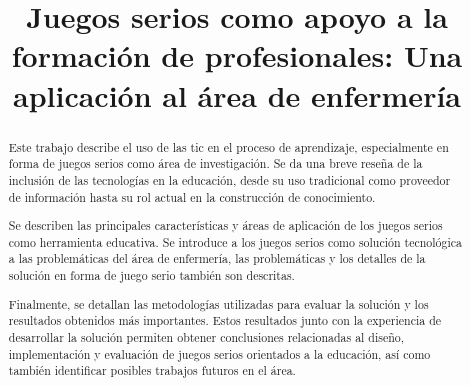 \documentclass[conference]{util/IEEEtran}
\begin{document}



\title{Juegos serios como apoyo a la formación de profesionales: Una aplicación al área de enfermería}

\author{
\and
{}
}

\maketitle
\thispagestyle{plain}


\begin{abstract}

Este trabajo describe el uso de las \gls{tic} en el proceso de aprendizaje, especialmente en forma de juegos serios como área de investigación. Se da una breve reseña de la inclusión de las tecnologías en la educación, desde su uso tradicional como proveedor de información hasta su rol actual en la construcción de conocimiento. 

Se describen las principales características y áreas de aplicación de los juegos serios como herramienta educativa. Se introduce a los juegos serios como solución tecnológica a las problemáticas del área de enfermería, las problemáticas y los detalles de la solución en forma de juego
serio también son descritas.

Finalmente, se detallan las metodologías utilizadas para evaluar la solución y
los resultados obtenidos más importantes. Estos resultados junto con la
experiencia de desarrollar la solución permiten obtener conclusiones
relacionadas al diseño, implementación y evaluación  de juegos serios orientados
a la educación, así como también identificar posibles trabajos futuros en el
área.


\end{abstract}
\end{document}
